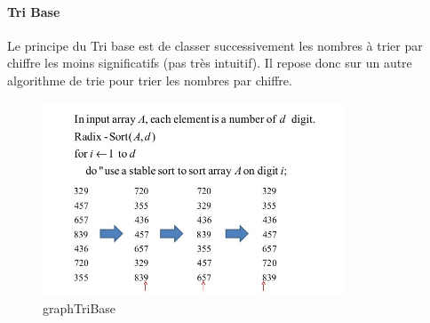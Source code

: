 \documentclass[11pt, a4paper]{article}
\begin{document}
\paragraph{Tri Base}
Le principe du Tri base est de classer successivement les nombres à trier par chiffre les moins significatifs (pas très intuitif).
Il repose donc sur un autre algorithme de trie pour trier les nombres par chiffre.
\begin{figure}[h]
    \centering
    \includegraphics[width=0.8\textwidth]{graphTriBase}
    \caption{graphTriBase}
    \label{fig:graphTriBase}
\end{figure}    
\end{document}
